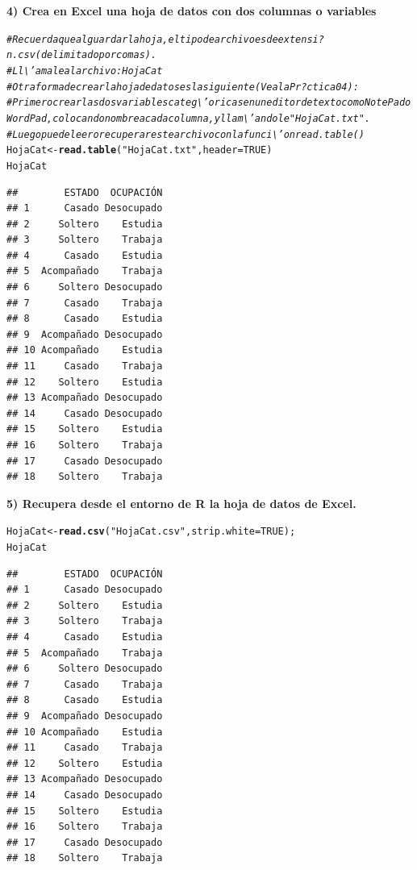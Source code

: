 \documentclass[12pt,letterpaper]{article}\usepackage[]{graphicx}\usepackage[]{color}
\makeatletter
\newcommand{\hlnum}[1]{\textcolor[rgb]{0.686,0.059,0.569}{#1}}%
\newcommand{\hlstr}[1]{\textcolor[rgb]{0.192,0.494,0.8}{#1}}%
\newcommand{\hlcom}[1]{\textcolor[rgb]{0.678,0.584,0.686}{\textit{#1}}}%
\newcommand{\hlstd}[1]{\textcolor[rgb]{0.345,0.345,0.345}{#1}}%
\newcommand{\hlkwb}[1]{\textcolor[rgb]{0.69,0.353,0.396}{#1}}%
\newcommand{\hlkwc}[1]{\textcolor[rgb]{0.333,0.667,0.333}{#1}}%
\newcommand{\hlkwd}[1]{\textcolor[rgb]{0.737,0.353,0.396}{\textbf{#1}}}%
\newenvironment{kframe}{%
 \def\at@end@of@kframe{}%
 \ifinner\ifhmode%
  \def\at@end@of@kframe{\end{minipage}}%
  \begin{minipage}{\columnwidth}%
 \fi\fi%
 \def\FrameCommand##1{\hskip\@totalleftmargin \hskip-\fboxsep
 \colorbox{shadecolor}{##1}\hskip-\fboxsep
     \hskip-\linewidth \hskip-\@totalleftmargin \hskip\columnwidth}%
 \MakeFramed {\advance\hsize-\width
   \@totalleftmargin\z@ \linewidth\hsize
   \@setminipage}}%
 {\par\unskip\endMakeFramed%
 \at@end@of@kframe}
\newenvironment{knitrout}{}{} %
\makeatother
\begin{document}
\textbf{4) Crea en Excel una hoja de datos con dos columnas o variables} 
\begin{knitrout}
\color{fgcolor}\begin{kframe}
\begin{alltt}
\hlcom{# Recuerda que al guardar la hoja, el tipo de archivo es de extensi?n .csv(delimitado por comas).}
\hlcom{# Ll\textbackslash{}'amale al archivo: HojaCat}
\hlcom{# Otra forma de crear la hoja de datos es la siguiente (Vea la Pr?ctica 04):}
\hlcom{# Primero crear las dos variables categ\textbackslash{}'oricas en un editor de texto como NotePad o WordPad,colocando nombre a cada columna, y llam\textbackslash{}'andole "HojaCat.txt".}
\hlcom{# Luego puede leer o recuperar este archivo con la funci\textbackslash{}'on read.table()}
\hlstd{HojaCat} \hlkwb{<-} \hlkwd{read.table}\hlstd{(}\hlstr{"HojaCat.txt"}\hlstd{,} \hlkwc{header}\hlstd{=}\hlnum{TRUE}\hlstd{)}
\hlstd{HojaCat}
\end{alltt}
\begin{verbatim}
##        ESTADO  OCUPACIÓN
## 1      Casado Desocupado
## 2     Soltero    Estudia
## 3     Soltero    Trabaja
## 4      Casado    Estudia
## 5  Acompañado    Trabaja
## 6     Soltero Desocupado
## 7      Casado    Trabaja
## 8      Casado    Estudia
## 9  Acompañado Desocupado
## 10 Acompañado    Estudia
## 11     Casado    Trabaja
## 12    Soltero    Estudia
## 13 Acompañado Desocupado
## 14     Casado Desocupado
## 15    Soltero    Estudia
## 16    Soltero    Trabaja
## 17     Casado Desocupado
## 18    Soltero    Trabaja
\end{verbatim}
\end{kframe}
\end{knitrout}
\textbf{5) Recupera desde el entorno de R la hoja de datos de Excel.} 
\begin{knitrout}
\color{fgcolor}\begin{kframe}
\begin{alltt}
\hlstd{HojaCat} \hlkwb{<-} \hlkwd{read.csv}\hlstd{(}\hlstr{"HojaCat.csv"}\hlstd{,} \hlkwc{strip.white}\hlstd{=}\hlnum{TRUE}\hlstd{);}
\hlstd{HojaCat}
\end{alltt}
\begin{verbatim}
##        ESTADO  OCUPACIÓN
## 1      Casado Desocupado
## 2     Soltero    Estudia
## 3     Soltero    Trabaja
## 4      Casado    Estudia
## 5  Acompañado    Trabaja
## 6     Soltero Desocupado
## 7      Casado    Trabaja
## 8      Casado    Estudia
## 9  Acompañado Desocupado
## 10 Acompañado    Estudia
## 11     Casado    Trabaja
## 12    Soltero    Estudia
## 13 Acompañado Desocupado
## 14     Casado Desocupado
## 15    Soltero    Estudia
## 16    Soltero    Trabaja
## 17     Casado Desocupado
## 18    Soltero    Trabaja
\end{verbatim}
\end{kframe}
\end{knitrout}
\end{document}

